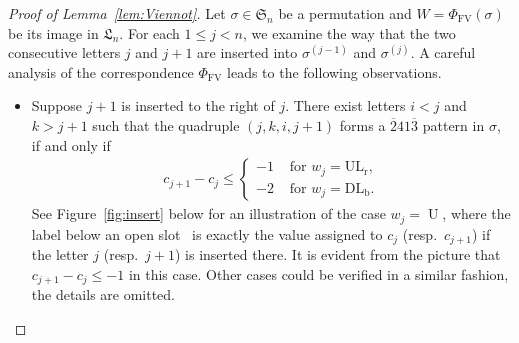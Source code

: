 \documentclass[12pt,reqno]{amsart}
\numberwithin{equation}{section}
\theoremstyle{plain}
\theoremstyle{definition}
\def\Sym{\mathfrak{S}}
\def\FV{\mathrm{FV}}
\def\rU{\operatorname{U}}
\def\ULr{\operatorname{UL_r}}
\def\DLb{\operatorname{DL_b}}
\def\LH{\mathfrak{L}}
\newcommand\varspace[1][.7em]{
  \makebox[#1]{
    \kern.07em
    \vrule height.3ex
    \hrulefill
    \vrule height.3ex
    \kern.07em
  }
}
\begin{document}
\begin{proof}[Proof of Lemma~\ref{lem:Viennot}]
Let $\sigma\in\Sym_n$ be a permutation and $W=\Phi_{\FV}(\sigma)$ be its image in $\LH_n$. For each $1\le j<n$, we examine the way that the two consecutive letters $j$ and $j+1$ are inserted into $\sigma^{(j-1)}$ and $\sigma^{(j)}$. A careful analysis of the correspondence $\Phi_{\FV}$ leads to the following observations.
\begin{itemize}
  \item Suppose $j+1$ is inserted to the right of $j$. There exist letters $i<j$ and $k>j+1$ such that the quadruple $(j,k,i,j+1)$ forms a $\overline{2}41\overline{3}$ pattern in $\sigma$, if and only if
  \begin{align*}
    c_{j+1}-c_j\le
    \begin{cases}
    -1 & \text{ for $w_j=\ULr$},\\
    -2 & \text{ for $w_j=\DLb$}.
    \end{cases}
  \end{align*}
  See Figure~\ref{fig:insert} below for an illustration of the case $w_j=\rU$, where the label below an open slot \varspace~is exactly the value assigned to $c_j$ (resp.~$c_{j+1}$) if the letter $j$ (resp.~$j+1$) is inserted there. It is evident from the picture that $c_{j+1}-c_j\le -1$ in this case. Other cases could be verified in a similar fashion, the details are omitted.
  \begin{figure}[!ht]
  \begin{center}
\end{center}
\end{figure}
\end{itemize}
\end{proof}
\end{document}
